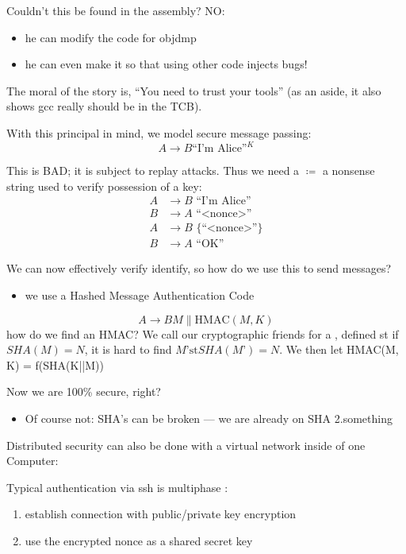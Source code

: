 \documentclass[../../lecture_notes.tex]{subfiles}
\begin{document}
Couldn’t this be found in the assembly? NO:
\begin{itemize}
	\item he can modify the code for objdmp
	\item he can even make it so that using other code injects bugs!
\end{itemize}

The moral of the story is, “You need to trust your tools” (as an aside, it also shows gcc really should be in the TCB).

With this principal in mind, we model secure message passing:
\[ A \to B {\text{“I’m Alice”}}^K \]

This is BAD; it is subject to replay attacks. Thus we need a  $\coloneqq$ a nonsense string used to verify possession of a key:
\begin{align*}
	A &\to B \text{ “I’m Alice”} \\
	B &\to A \text{ “<nonce>”} \\
	A &\to B \text{ \{“<nonce>”\}} \\
	B &\to A \text{ “OK”}
\end{align*}

We can now effectively verify identify, so how do we use this to send messages?
\begin{itemize}
\item we use a Hashed Message Authentication Code
\end{itemize}

\[ A → B M \parallel \mathrm{HMAC}(M, K) \]
how do we find an HMAC?
We call our cryptographic friends for a , defined st if $SHA(M) = N$, it is hard to find $M’ \mathrm{st} SHA(M’) = N$. We then let HMAC(M, K) = f(SHA(K||M))

Now we are 100\% secure, right?
\begin{itemize}
\item Of course not: SHA’s can be broken — we are already on SHA 2.something
\end{itemize}


Distributed security can also be done with a virtual network inside of one Computer:

Typical authentication via ssh is multiphase :
\begin{enumerate}[nosep]
\item establish connection with public/private key encryption
\item use the encrypted nonce as a shared secret key
\end{enumerate}
\end{document}
